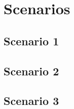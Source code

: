 \section{Scenarios}
\blindtext

\subsection{Scenario 1}
\blindtext

\subsection{Scenario 2}
\blindtext

\subsection{Scenario 3}
\blindtext
